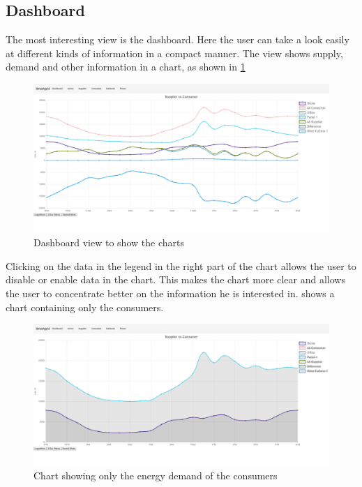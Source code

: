 \subsection{Dashboard}
The most interesting view is the dashboard.
Here the user can take a look easily at different kinds of information in a compact manner.
The view shows supply, demand and other information in a chart, as shown in \cref{fig:dashboard}

\begin{figure}[!h]
    \centering
\includegraphics[width=1.00\textwidth]{../figures/Overview.png}
    \caption{Dashboard view to show the charts}
    \label{fig:dashboard}
\end{figure}

Clicking on the data in the legend in the right part of the chart allows the user to disable or enable data in the chart.
This makes the chart more clear and allows the user to concentrate better on the information he is interested in.
 shows a chart containing only the consumers.

\begin{figure}[!h]
    \centering
\includegraphics[width=1.00\textwidth]{../figures/ConsumerStacked.png}
    \caption{Chart showing only the energy demand of the consumers}
    \label{fig:consumerChart}
\end{figure}

